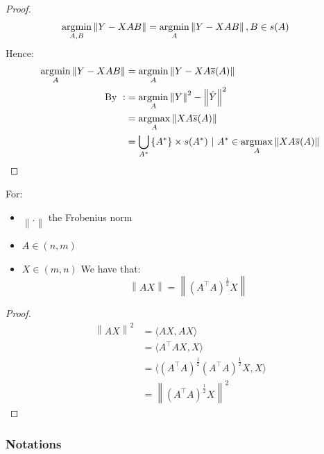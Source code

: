 \begin{proof}

\[
\begin{aligned}
\operatorname*{\arg\!\min}_{A,B}\left\| {Y - XAB} \right\| & = \operatorname*{\arg\!\min}_{A}\left\| {Y - XAB} \right\|,B \in s(A)
\end{aligned}
\]
Hence:
\[
\begin{aligned}
    \operatorname*{\arg\!\min}_{A}\left\| {Y - XAB} \right\| & = \operatorname*{\arg\!\min}_{A}\left\| {Y - XA\overline{s}(A)} \right\| \\
    \text{By}\ {}: & = \operatorname*{\arg\!\min}_{A}\left\| Y \right\|^{2} - \left\| \hat{Y} \right\|^{2} \\
     & = \operatorname*{\arg\!\max}_{A}\left\| {XA\overline{s}(A)} \right\| \\
     & = \bigcup_{A^{\ast}}\left\{ A^{\ast} \right\} \times s(A^{\ast})~|~A^{\ast} \in \operatorname*{\arg\!\max}_{A}\left\| {XA\overline{s}(A)} \right\|
\end{aligned}
\]

\end{proof}

\begin{theorem}\label{theorem:rimannian_norm}

For:

\begin{itemize}
\item
  \(\left\| . \right\|\) the Frobenius norm
\item
  \(A \in (n,m)\)
\item
  \(X \in (m,n)\) We have that:
  \[\left\| {AX} \right\| = \left\| {\left( A^{\top}A \right)^{\frac{1}{2}}X} \right\|\]
\end{itemize}

\end{theorem}

\begin{proof}

\[\begin{aligned}
\left\| {AX} \right\|^{2} & = {\langle AX,AX\rangle} \\
 & = {\langle A^{\top}AX,X\rangle} \\
 & = {\langle\left( A^{\top}A \right)^{\frac{1}{2}}\left( A^{\top}A \right)^{\frac{1}{2}}X,X\rangle} \\
 & = \left\| {\left( A^{\top}A \right)^{\frac{1}{2}}X} \right\|^{2}
\end{aligned}\]

\end{proof}

\subsubsection{Notations}

